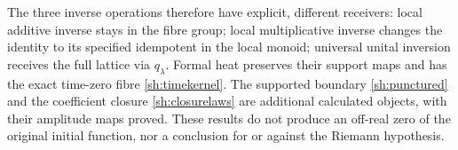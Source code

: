 The three inverse operations therefore have explicit, different
receivers: local additive inverse stays in the fibre group;
local multiplicative inverse changes the identity to its
specified idempotent in the local monoid; universal unital
inversion receives the full lattice via $q_\lambda$.
Formal heat preserves their support maps and has the exact
time-zero fibre \eqref{sh:timekernel}. The supported boundary
\eqref{sh:punctured} and the coefficient closure
\eqref{sh:closurelaws} are additional calculated objects, with
their amplitude maps proved. These results do not produce an
off-real zero of the original initial function, nor a conclusion
for or against the Riemann hypothesis.
